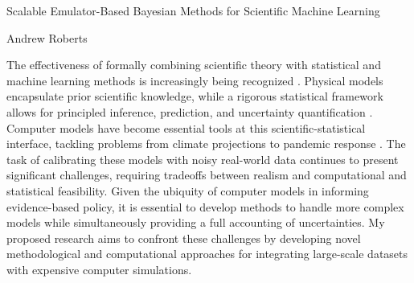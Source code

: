 \documentclass[11pt]{article}
\begin{document}
\begin{center}
Scalable Emulator-Based Bayesian Methods for Scientific Machine Learning
\end{center}

\begin{flushright}
Andrew Roberts
\end{flushright} 

The effectiveness of formally combining scientific theory with statistical and machine learning methods is increasingly being recognized \cite{Willcox, Laubmeier, Wikle}. 
Physical models encapsulate prior scientific knowledge, while a rigorous statistical framework allows for principled inference, prediction, and uncertainty quantification \cite{Wikle}. Computer models have become essential tools at this scientific-statistical interface, tackling problems from 
climate projections \cite{Canadell} to pandemic response \cite{Swallow}. The task of calibrating these models with noisy real-world data continues to present
significant challenges, requiring tradeoffs between realism and computational and statistical feasibility. Given the ubiquity of computer models in informing
 evidence-based policy, it is essential to develop methods to handle more complex models while simultaneously providing a full accounting of uncertainties.
 My proposed research aims to confront these challenges by developing novel methodological and computational approaches for integrating large-scale datasets with expensive computer simulations. 
\end{document}
